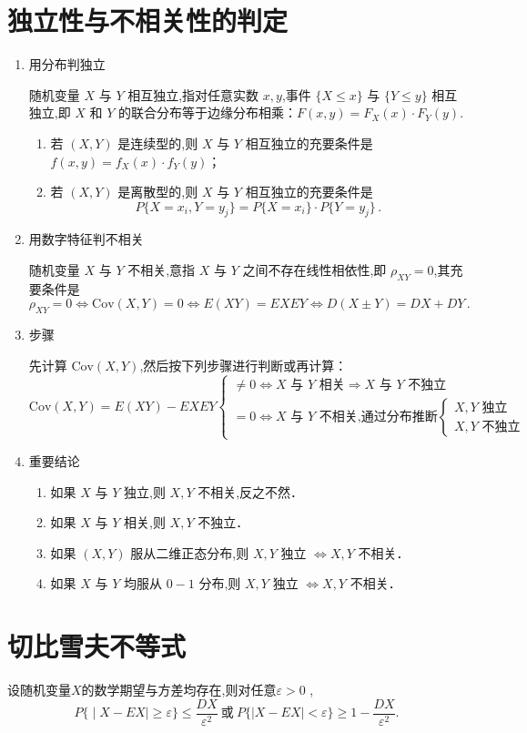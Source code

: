 \section{独立性与不相关性的判定}
\begin{enumerate}
      \item 用分布判独立

            随机变量 $X$ 与 $Y$ 相互独立,指对任意实数 $x, y$,事件 $\{X \leqslant x\}$ 与 $\{Y \leqslant y\}$ 相互独立,即 $X$ 和 $Y$ 的联合分布等于边缘分布相乘：$F(x, y) = F_X(x) \cdot F_Y(y)$.
            \begin{enumerate}
                  \item 若 $(X, Y)$ 是连续型的,则 $X$ 与 $Y$ 相互独立的充要条件是 $f(x, y) = f_X(x) \cdot f_Y(y)$；
                  \item 若 $(X, Y)$ 是离散型的,则 $X$ 与 $Y$ 相互独立的充要条件是
                        $$P\{X = x_i, Y = y_j\} = P\{X = x_i\} \cdot P\{Y = y_j\} \, .$$
            \end{enumerate}

      \item 用数字特征判不相关

            随机变量 $X$ 与 $Y$ 不相关,意指 $X$ 与 $Y$ 之间不存在线性相依性,即 $\rho_{XY} = 0$,其充要条件是
            $$\rho_{XY} = 0 \Leftrightarrow \text{Cov}(X, Y) = 0 \Leftrightarrow E(XY) = EXEY \Leftrightarrow D(X \pm Y) = DX + DY \, .$$
      \item 步骤

            先计算 $\text{Cov}(X, Y)$,然后按下列步骤进行判断或再计算：
            $$\text{Cov}(X, Y) = E(XY) - EXEY \begin{cases} \neq 0 \Leftrightarrow X \text{ 与 } Y \text{ 相关} \Rightarrow X \text{ 与 } Y \text{ 不独立} \\ = 0 \Leftrightarrow X \text{ 与 } Y \text{ 不相关} \text{,通过分布推断} \begin{cases} X, Y \text{ 独立} \\ X, Y \text{ 不独立} \end{cases} \end{cases}$$

      \item 重要结论
            \begin{enumerate}
                  \item 如果 $X$ 与 $Y$ 独立,则 $X, Y$ 不相关,反之不然．
                  \item 如果 $X$ 与 $Y$ 相关,则 $X, Y$ 不独立．
                  \item 如果 $(X, Y)$ 服从二维正态分布,则 $X, Y$ 独立 $\Leftrightarrow X, Y$ 不相关．
                  \item 如果 $X$ 与 $Y$ 均服从 $0-1$ 分布,则 $X, Y$ 独立 $\Leftrightarrow X, Y$ 不相关．
            \end{enumerate}
\end{enumerate}

\section{切比雪夫不等式}
设随机变量$X$的数学期望与方差均存在,则对任意$\varepsilon>0$ ,
$$P\big\{\mid X-EX\mid\geqslant\varepsilon\big\}\leqslant\frac{DX}{\varepsilon^{2}}\:\text{或}\:P\{\big|X-EX\big|<\varepsilon\}\geqslant1-\frac{DX}{\varepsilon^{2}}.$$